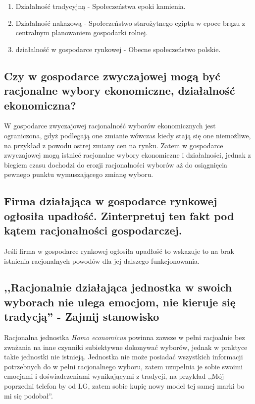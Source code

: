 \documentclass[a4paper,12pt]{article}
\begin{document}
\begin{enumerate}
	\item Działalność tradycyjną - Społeczeństwa epoki kamienia.
	\item Działalność nakazową - Społeczeństwo starożytnego egiptu w epoce brązu z centralnym planowaniem gospodarki rolnej.
	\item działalność w gospodarce rynkowej - Obecne społeczeństwo polskie.
\end{enumerate}

\subsection{Czy w gospodarce zwyczajowej mogą być racjonalne wybory ekonomiczne, działalność ekonomiczna?}
W gospodarce zwyczajowej racjonalność wyborów ekonomicznych jest ograniczona, gdyż podlegają one zmianie wówczas kiedy stają się one niemożliwe, na przykład z powodu ostrej zmiany cen na rynku. Zatem w gospodarce zwyczajowej mogą istnieć racjonalne wybory ekonomiczne i działalności, jednak z biegiem czasu dochodzi do erozji racjonalności wyborów aż do osiągnięcia pewnego punktu wymuszającego zmianę wyboru.

\subsection{Firma działająca w gospodarce rynkowej ogłosiła upadłość. Zinterpretuj ten fakt pod kątem racjonalności gospodarczej.}

Jeśli firma w gospodarce rynkowej ogłosiła upadłość to wskazuje to na brak istnienia racjonalnych powodów dla jej dalszego funkcjonowania.

\subsection{,,Racjonalnie działająca jednostka w swoich wyborach nie ulega emocjom, nie kieruje się tradycją'' - Zajmij stanowisko}

Racjonalna jednostka \emph{Homo economicus} powinna zawsze w pełni racjoalnie bez zważania na inne czynniki subiektywne dokonywać wyborów, jednak w praktyce takie jednostki nie istnieją. Jednostka nie może posiadać wszystkich informacji potrzebnych do w pełni racjonalnego wyboru, zatem uzupełnia je sobie swoimi emocjami i doświadczeniami wynikającymi z tradycji, na przykład ,,Mój poprzedni telefon by od LG, zatem sobie kupię nowy model tej samej marki bo mi się podobał''.
\end{document}
